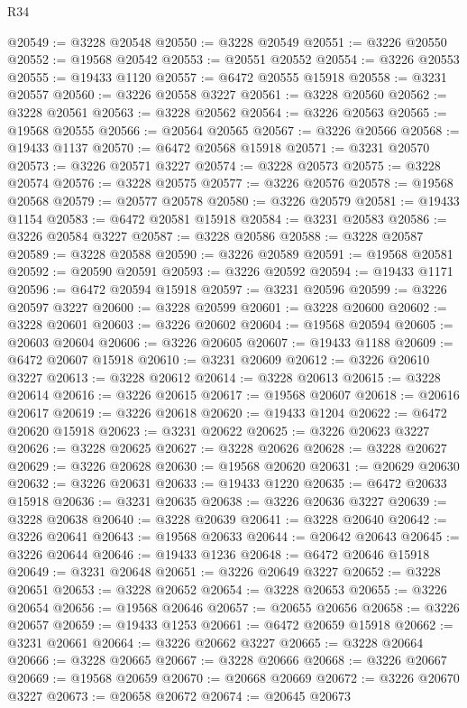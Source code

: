 \begin{lexlean}{R34}
\begin{coremodule}
@20549 := @3228 @20548
@20550 := @3228 @20549
@20551 := @3226 @20550
@20552 := @19568 @20542
@20553 := @20551 @20552
@20554 := @3226 @20553
@20555 := @19433 @1120
@20557 := @6472 @20555 @15918
@20558 := @3231 @20557
@20560 := @3226 @20558 @3227
@20561 := @3228 @20560
@20562 := @3228 @20561
@20563 := @3228 @20562
@20564 := @3226 @20563
@20565 := @19568 @20555
@20566 := @20564 @20565
@20567 := @3226 @20566
@20568 := @19433 @1137
@20570 := @6472 @20568 @15918
@20571 := @3231 @20570
@20573 := @3226 @20571 @3227
@20574 := @3228 @20573
@20575 := @3228 @20574
@20576 := @3228 @20575
@20577 := @3226 @20576
@20578 := @19568 @20568
@20579 := @20577 @20578
@20580 := @3226 @20579
@20581 := @19433 @1154
@20583 := @6472 @20581 @15918
@20584 := @3231 @20583
@20586 := @3226 @20584 @3227
@20587 := @3228 @20586
@20588 := @3228 @20587
@20589 := @3228 @20588
@20590 := @3226 @20589
@20591 := @19568 @20581
@20592 := @20590 @20591
@20593 := @3226 @20592
@20594 := @19433 @1171
@20596 := @6472 @20594 @15918
@20597 := @3231 @20596
@20599 := @3226 @20597 @3227
@20600 := @3228 @20599
@20601 := @3228 @20600
@20602 := @3228 @20601
@20603 := @3226 @20602
@20604 := @19568 @20594
@20605 := @20603 @20604
@20606 := @3226 @20605
@20607 := @19433 @1188
@20609 := @6472 @20607 @15918
@20610 := @3231 @20609
@20612 := @3226 @20610 @3227
@20613 := @3228 @20612
@20614 := @3228 @20613
@20615 := @3228 @20614
@20616 := @3226 @20615
@20617 := @19568 @20607
@20618 := @20616 @20617
@20619 := @3226 @20618
@20620 := @19433 @1204
@20622 := @6472 @20620 @15918
@20623 := @3231 @20622
@20625 := @3226 @20623 @3227
@20626 := @3228 @20625
@20627 := @3228 @20626
@20628 := @3228 @20627
@20629 := @3226 @20628
@20630 := @19568 @20620
@20631 := @20629 @20630
@20632 := @3226 @20631
@20633 := @19433 @1220
@20635 := @6472 @20633 @15918
@20636 := @3231 @20635
@20638 := @3226 @20636 @3227
@20639 := @3228 @20638
@20640 := @3228 @20639
@20641 := @3228 @20640
@20642 := @3226 @20641
@20643 := @19568 @20633
@20644 := @20642 @20643
@20645 := @3226 @20644
@20646 := @19433 @1236
@20648 := @6472 @20646 @15918
@20649 := @3231 @20648
@20651 := @3226 @20649 @3227
@20652 := @3228 @20651
@20653 := @3228 @20652
@20654 := @3228 @20653
@20655 := @3226 @20654
@20656 := @19568 @20646
@20657 := @20655 @20656
@20658 := @3226 @20657
@20659 := @19433 @1253
@20661 := @6472 @20659 @15918
@20662 := @3231 @20661
@20664 := @3226 @20662 @3227
@20665 := @3228 @20664
@20666 := @3228 @20665
@20667 := @3228 @20666
@20668 := @3226 @20667
@20669 := @19568 @20659
@20670 := @20668 @20669
@20672 := @3226 @20670 @3227
@20673 := @20658 @20672
@20674 := @20645 @20673

\end{coremodule}
\end{lexlean}

